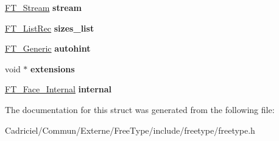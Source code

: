 \begin{DoxyCompactItemize}
\item 
\hypertarget{struct_f_t___face_rec___a831d5da25cd0fe2a783d2a73f467de55}{\hyperlink{struct_f_t___stream_rec__}{F\-T\-\_\-\-Stream} {\bfseries stream}}\label{struct_f_t___face_rec___a831d5da25cd0fe2a783d2a73f467de55}

\item 
\hypertarget{struct_f_t___face_rec___a47504203e02bfba59c802c35cb4009ed}{\hyperlink{struct_f_t___list_rec__}{F\-T\-\_\-\-List\-Rec} {\bfseries sizes\-\_\-list}}\label{struct_f_t___face_rec___a47504203e02bfba59c802c35cb4009ed}

\item 
\hypertarget{struct_f_t___face_rec___a34ba9b1367f1b2d13676043b8da3ea73}{\hyperlink{struct_f_t___generic__}{F\-T\-\_\-\-Generic} {\bfseries autohint}}\label{struct_f_t___face_rec___a34ba9b1367f1b2d13676043b8da3ea73}

\item 
\hypertarget{struct_f_t___face_rec___a8b24f993e38da597d3e0273267890f49}{void $\ast$ {\bfseries extensions}}\label{struct_f_t___face_rec___a8b24f993e38da597d3e0273267890f49}

\item 
\hypertarget{struct_f_t___face_rec___aed9a1267cddcbe790f0591471c886537}{\hyperlink{struct_f_t___face___internal_rec__}{F\-T\-\_\-\-Face\-\_\-\-Internal} {\bfseries internal}}\label{struct_f_t___face_rec___aed9a1267cddcbe790f0591471c886537}

\end{DoxyCompactItemize}


The documentation for this struct was generated from the following file\-:\begin{DoxyCompactItemize}
\item 
Cadriciel/\-Commun/\-Externe/\-Free\-Type/include/freetype/freetype.\-h\end{DoxyCompactItemize}
